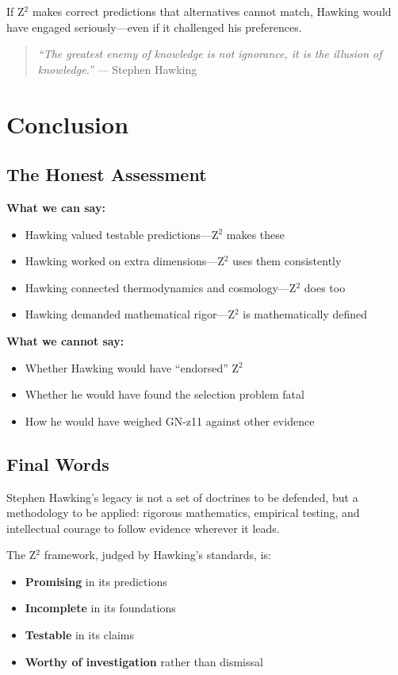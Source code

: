 \documentclass[12pt,a4paper]{article}
\begin{document}
If Z$^2$ makes correct predictions that alternatives cannot match, Hawking would have engaged seriously---even if it challenged his preferences.

\begin{quote}
\textit{``The greatest enemy of knowledge is not ignorance, it is the illusion of knowledge.''} --- Stephen Hawking
\end{quote}

\section{Conclusion}

\subsection{The Honest Assessment}

\textbf{What we can say:}
\begin{itemize}
\item Hawking valued testable predictions---Z$^2$ makes these
\item Hawking worked on extra dimensions---Z$^2$ uses them consistently
\item Hawking connected thermodynamics and cosmology---Z$^2$ does too
\item Hawking demanded mathematical rigor---Z$^2$ is mathematically defined
\end{itemize}

\textbf{What we cannot say:}
\begin{itemize}
\item Whether Hawking would have ``endorsed'' Z$^2$
\item Whether he would have found the selection problem fatal
\item How he would have weighed GN-z11 against other evidence
\end{itemize}

\subsection{Final Words}

Stephen Hawking's legacy is not a set of doctrines to be defended, but a methodology to be applied: rigorous mathematics, empirical testing, and intellectual courage to follow evidence wherever it leads.

The Z$^2$ framework, judged by Hawking's standards, is:
\begin{itemize}
\item \textbf{Promising} in its predictions
\item \textbf{Incomplete} in its foundations
\item \textbf{Testable} in its claims
\item \textbf{Worthy of investigation} rather than dismissal
\end{itemize}
\end{document}
